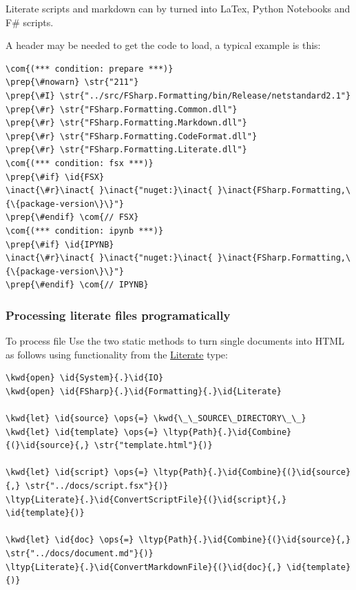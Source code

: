 \documentclass{article}
\newcommand{\id}[1]{\textcolor{black}{#1}}
\newcommand{\com}[1]{\textcolor{officegreen}{#1}}
\newcommand{\inact}[1]{\textcolor{gray}{#1}}
\newcommand{\kwd}[1]{\textcolor{navy}{#1}}
\newcommand{\ops}[1]{\textcolor{purple}{#1}}
\newcommand{\prep}[1]{\textcolor{purple}{#1}}
\newcommand{\str}[1]{\textcolor{olive}{#1}}
\begin{document}
Literate scripts and markdown can by turned into LaTex, Python Notebooks and F\# scripts.


A header may be needed to get the code to load, a typical example is this:
\begin{Verbatim}[commandchars=\\\{\}]
\com{(*** condition: prepare ***)}
\prep{\#nowarn} \str{"211"}
\prep{\#I} \str{"../src/FSharp.Formatting/bin/Release/netstandard2.1"}
\prep{\#r} \str{"FSharp.Formatting.Common.dll"}
\prep{\#r} \str{"FSharp.Formatting.Markdown.dll"}
\prep{\#r} \str{"FSharp.Formatting.CodeFormat.dll"}
\prep{\#r} \str{"FSharp.Formatting.Literate.dll"}
\com{(*** condition: fsx ***)}
\prep{\#if} \id{FSX}
\inact{\#r}\inact{ }\inact{"nuget:}\inact{ }\inact{FSharp.Formatting,\{\{package-version\}\}"}
\prep{\#endif} \com{// FSX}
\com{(*** condition: ipynb ***)}
\prep{\#if} \id{IPYNB}
\inact{\#r}\inact{ }\inact{"nuget:}\inact{ }\inact{FSharp.Formatting,\{\{package-version\}\}"}
\prep{\#endif} \com{// IPYNB}

\end{Verbatim}

\subsubsection*{Processing literate files programatically}



To process file Use the two static methods to turn single documents into HTML
as follows using functionality from the \href{https://fsprojects.github.io/FSharp.Formatting/reference/fsharp-formatting-literate-literate.html}{Literate} type:
\begin{Verbatim}[commandchars=\\\{\}]
\kwd{open} \id{System}{.}\id{IO}
\kwd{open} \id{FSharp}{.}\id{Formatting}{.}\id{Literate}

\kwd{let} \id{source} \ops{=} \kwd{\_\_SOURCE\_DIRECTORY\_\_}
\kwd{let} \id{template} \ops{=} \ltyp{Path}{.}\id{Combine}{(}\id{source}{,} \str{"template.html"}{)}

\kwd{let} \id{script} \ops{=} \ltyp{Path}{.}\id{Combine}{(}\id{source}{,} \str{"../docs/script.fsx"}{)}
\ltyp{Literate}{.}\id{ConvertScriptFile}{(}\id{script}{,} \id{template}{)}

\kwd{let} \id{doc} \ops{=} \ltyp{Path}{.}\id{Combine}{(}\id{source}{,} \str{"../docs/document.md"}{)}
\ltyp{Literate}{.}\id{ConvertMarkdownFile}{(}\id{doc}{,} \id{template}{)}
\end{Verbatim}
\end{document}
